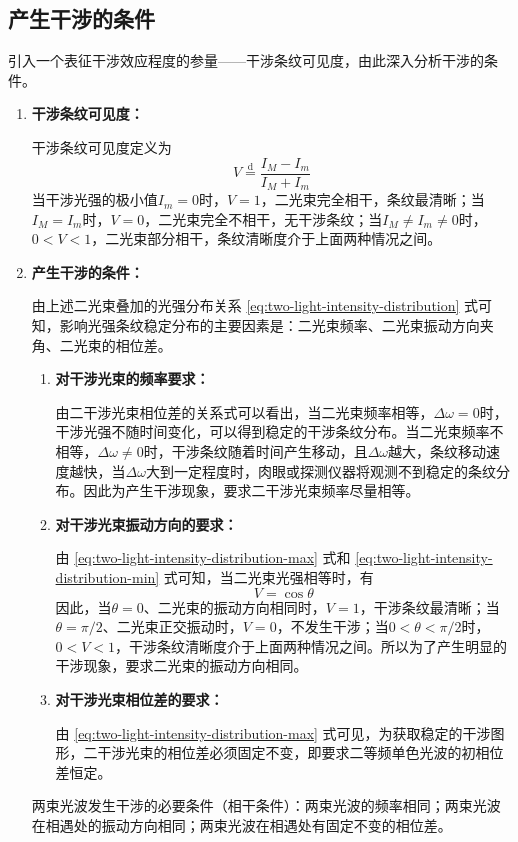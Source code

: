 \documentclass[cn,10pt,chinesefont=founder,math=mtpro2,cite=super,toc=onecol,twoside]{elegantbook}
\begin{document}
\subsection{产生干涉的条件}
引入一个表征干涉效应程度的参量——干涉条纹可见度，由此深入分析干涉的条件。
\begin{enumerate}
	\item \textbf{干涉条纹可见度：}
	
	干涉条纹可见度定义为
	\begin{equation}
	V\overset{\text{d}}{=}\frac{I_M-I_m}{I_M+I_m}
	\end{equation}
	当干涉光强的极小值$I_m=0$时，$V=1$，二光束完全相干，条纹最清晰；当$I_M=I_m$时，$V=0$，二光束完全不相干，无干涉条纹；当$I_M\neq I_m\neq0$时，$0<V<1$，二光束部分相干，条纹清晰度介于上面两种情况之间。
	
	
	\item \textbf{产生干涉的条件：}
	
	由上述二光束叠加的光强分布关系 \eqref{eq:two-light-intensity-distribution} 式可知，影响光强条纹稳定分布的主要因素是：二光束频率、二光束振动方向夹角、二光束的相位差。
	\begin{enumerate}
		\item \textbf{对干涉光束的频率要求：}
		
		由二干涉光束相位差的关系式可以看出，当二光束频率相等，$\Delta\omega=0$时，干涉光强不随时间变化，可以得到稳定的干涉条纹分布。当二光束频率不相等，$\Delta\omega\neq0$时，干涉条纹随着时间产生移动，且$\Delta\omega$越大，条纹移动速度越快，当$\Delta\omega$大到一定程度时，肉眼或探测仪器将观测不到稳定的条纹分布。因此为产生干涉现象，要求二干涉光束频率尽量相等。
		\item \textbf{对干涉光束振动方向的要求：}
		
		由 \eqref{eq:two-light-intensity-distribution-max} 式和 \eqref{eq:two-light-intensity-distribution-min} 式可知，当二光束光强相等时，有
		\begin{equation}
		V=\cos\theta
		\end{equation}
		因此，当$\theta=0$、二光束的振动方向相同时，$V=1$，干涉条纹最清晰；当$\theta=\pi/2$、二光束正交振动时，$V=0$，不发生干涉；当$0<\theta<\pi/2$时，$0<V<1$，干涉条纹清晰度介于上面两种情况之间。所以为了产生明显的干涉现象，要求二光束的振动方向相同。
		\item \textbf{对干涉光束相位差的要求：}
		
		由 \eqref{eq:two-light-intensity-distribution-max} 式可见，为获取稳定的干涉图形，二干涉光束的相位差必须固定不变，即要求二等频单色光波的初相位差恒定。
	\end{enumerate}
	\begin{conclusion}
	两束光波发生干涉的必要条件（相干条件）：两束光波的频率相同；两束光波在相遇处的振动方向相同；两束光波在相遇处有固定不变的相位差。
	\end{conclusion}
\end{enumerate}
\end{document}
